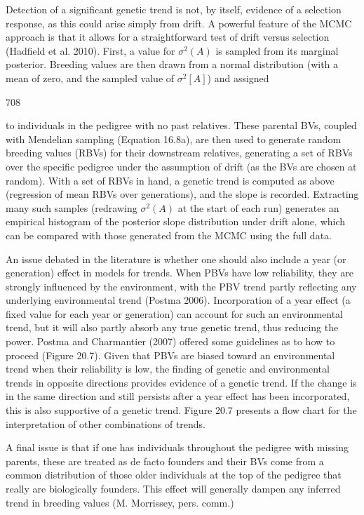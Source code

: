\documentclass{article}
\begin{document}
Detection of a significant genetic trend is not, by itself, evidence of a selection response, as this could arise simply from drift. A powerful feature of the MCMC approach is that it allows for a straightforward test of drift versus selection (Hadfield et al. 2010). First, a value for  $ \sigma^{2}(A) $ is sampled from its marginal posterior. Breeding values are then drawn from a normal distribution (with a mean of zero, and the sampled value of  $ \sigma^{2}[A] $) and assigned

708

to individuals in the pedigree with no past relatives. These parental BVs, coupled with Mendelian sampling (Equation 16.8a), are then used to generate random breeding values (RBVs) for their downstream relatives, generating a set of RBVs over the specific pedigree under the assumption of drift (as the BVs are chosen at random). With a set of RBVs in hand, a genetic trend is computed as above (regression of mean RBVs over generations), and the slope is recorded. Extracting many such samples (redrawing  $ \sigma^{2}(A) $ at the start of each run) generates an empirical histogram of the posterior slope distribution under drift alone, which can be compared with those generated from the MCMC using the full data.

An issue debated in the literature is whether one should also include a year (or generation) effect in models for trends. When PBVs have low reliability, they are strongly influenced by the environment, with the PBV trend partly reflecting any underlying environmental trend (Postma 2006). Incorporation of a year effect (a fixed value for each year or generation) can account for such an environmental trend, but it will also partly absorb any true genetic trend, thus reducing the power. Postma and Charmantier (2007) offered some guidelines as to how to proceed (Figure 20.7). Given that PBVs are biased toward an environmental trend when their reliability is low, the finding of genetic and environmental trends in opposite directions provides evidence of a genetic trend. If the change is in the same direction and still persists after a year effect has been incorporated, this is also supportive of a genetic trend. Figure 20.7 presents a flow chart for the interpretation of other combinations of trends.

A final issue is that if one has individuals throughout the pedigree with missing parents, these are treated as de facto founders and their BVs come from a common distribution of those older individuals at the top of the pedigree that really are biologically founders. This effect will generally dampen any inferred trend in breeding values (M. Morrissey, pers. comm.)
\end{document}
